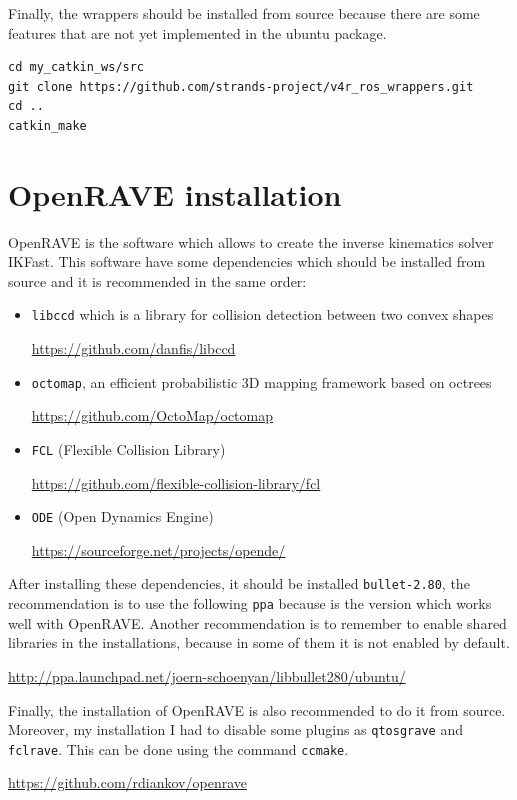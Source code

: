 \documentclass[12pt,a4paper,final,twoside,openright]{report}
\begin{document}
Finally, the wrappers should be installed from source because there are some features that are not yet implemented in the ubuntu package.

\begin{lstlisting}[language=Git]
cd my_catkin_ws/src
git clone https://github.com/strands-project/v4r_ros_wrappers.git
cd ..
catkin_make
\end{lstlisting}

\section{OpenRAVE installation}
\label{app:ikfast}

OpenRAVE is the software which allows to create the inverse kinematics solver IKFast. This software have some dependencies which should be installed from source and it is recommended in the same order:

\begin{itemize}
\item \texttt{libccd} which is a library for collision detection between two convex shapes

\url{https://github.com/danfis/libccd}

\item \texttt{octomap}, an efficient probabilistic 3D mapping framework based on octrees

\url{https://github.com/OctoMap/octomap}

\item \texttt{FCL} (Flexible Collision Library)

\url{https://github.com/flexible-collision-library/fcl}

\item \texttt{ODE} (Open Dynamics Engine)

\url{https://sourceforge.net/projects/opende/}
\end{itemize}

After installing these dependencies, it should be installed \texttt{bullet-2.80}, the recommendation is to use the following \texttt{ppa} because is the version which works well with OpenRAVE. Another recommendation is to remember to enable shared libraries in the installations, because in some of them it is not enabled by default.

\url{http://ppa.launchpad.net/joern-schoenyan/libbullet280/ubuntu/}

Finally, the installation of OpenRAVE is also recommended to do it from source. Moreover, my installation I had to disable some plugins as \texttt{qtosgrave} and \texttt{fclrave}. This can be done using the command \texttt{ccmake}.

\url{https://github.com/rdiankov/openrave}
\end{document}
